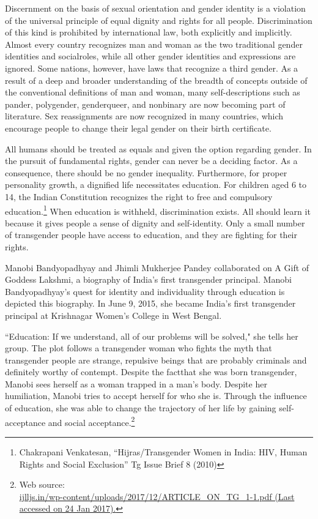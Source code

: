 \begin{multicols}{2}
\noi
Discernment on the basis of sexual orientation and gender identity is a violation of the universal
principle of equal dignity and rights for all people. Discrimination of this kind is prohibited by
international law, both explicitly and implicitly. Almost every country recognizes man and
woman as the two traditional gender identities and socialroles, while all other gender identities
and expressions are ignored. Some nations, however, have laws that recognize a third gender.
As a result of a deep and broader understanding of the breadth of concepts outside of the
conventional definitions of man and woman, many self-descriptions such as pander,
polygender, genderqueer, and nonbinary are now becoming part of literature. Sex
reassignments are now recognized in many countries, which encourage people to change their
legal gender on their birth certificate.

\vspace{-.15cm}


\vspace{-.15cm}

\noi
All humans should be treated as equals and given the option regarding gender. In the pursuit
of fundamental rights, gender can never be a deciding factor. As a consequence, there should
be no gender inequality. Furthermore, for proper personality growth, a dignified life
necessitates education. For children aged 6 to 14, the Indian Constitution recognizes the right to free and compulsory education.\footnote{Chakrapani Venkatesan, “Hijras/Transgender Women in India: HIV, Human Rights and Social Exclusion” Tg Issue Brief 8 (2010)} When education is withheld, discrimination exists. All should learn it because it gives people a sense of dignity and self-identity. Only a small number of transgender people have access to education, and they are fighting for their rights.

\noi
Manobi Bandyopadhyay and Jhimli Mukherjee Pandey collaborated on A Gift of Goddess
Lakshmi, a biography of India's first transgender principal. Manobi Bandyopadhyay's quest for
identity and individuality through education is depicted this biography. In June 9, 2015, she
became India's first transgender principal at Krishnagar Women's College in West Bengal.

\noi
“Education: If we understand, all of our problems will be solved," she tells her group. The plot
follows a transgender woman who fights the myth that transgender people are strange, repulsive
beings that are probably criminals and definitely worthy of contempt. Despite the factthat she
was born transgender, Manobi sees herself as a woman trapped in a man's body. Despite her
humiliation, Manobi tries to accept herself for who she is. Through the influence of education,
she was able to change the trajectory of her life by gaining self-acceptance and social
acceptance.\footnote{Web source:\\ \url{ijlljs.in/wp-content/uploads/2017/12/ARTICLE_ON_TG_1-1.pdf (Last accessed on 24 Jan 2017).}}


\end{multicols}
